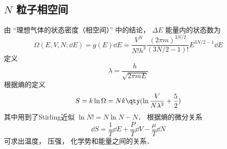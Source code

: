 
\begin{issues}
\issueDraft
\end{issues}

\subsection{$N$ 粒子相空间}

由 “理想气体的状态密度（相空间）” 中的结论， $\Delta E$ 能量内的状态数为
\begin{equation}
\Omega (E,V,N; \dd{E}) = g(E)\dd{E} = \frac{V^N}{N! h^3}\frac{(2\pi m)^{3N/2}}{(3N/2-1)!}E^{3N/2 - 1} \dd{E}
\end{equation}
定义
\begin{equation}
\lambda  = \frac{h}{\sqrt{2\pi mE}}
\end{equation}
根据熵的定义%
\begin{equation}
S = k\ln \Omega  = Nk \qty(\ln \frac{V}{N\lambda^3} + \frac52)
\end{equation}
其中用到了Stirling近似%
$\ln N! = N\ln N - N$． 根据熵的微分关系
\begin{equation}
\dd{S} = \frac{1}{T} \dd{E} + \frac{P}{T} \dd{V} - \frac{\mu}{T} \dd{N}
\end{equation}
可求出温度， 压强， 化学势和能量之间的关系．
